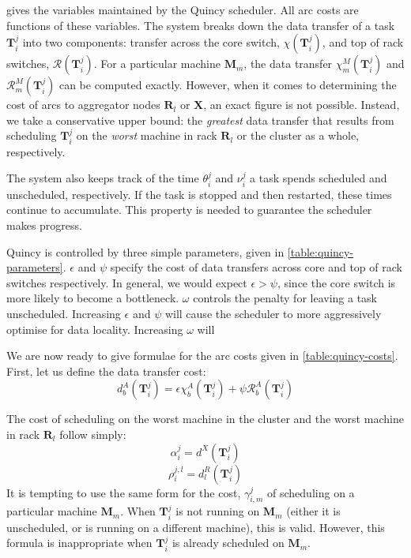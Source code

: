  gives the variables maintained by the Quincy scheduler. All arc costs are functions of these variables. The system breaks down the data transfer of a task $\mathbf{T}_{i}^{j}$ into two components: transfer across the core switch, $\chi\left(\mathbf{T}_{i}^{j}\right)$, and top of rack switches, $\mathcal{R}\left(\mathbf{T}_{i}^{j}\right)$. For a particular machine $\mathbf{M}_m$, the data transfer $\chi_{m}^{M}\left(\mathbf{T}_{i}^{j}\right)$ and $\mathcal{R}_{m}^{M}\left(\mathbf{T}_{i}^{j}\right)$ can be computed exactly. However, when it comes to determining the cost of arcs to aggregator nodes $\mathbf{R}_l$ or $\mathbf{X}$, an exact figure is not possible. Instead, we take a conservative upper bound: the \emph{greatest} data transfer that results from scheduling $\mathbf{T}_{i}^{j}$ on the \emph{worst} machine in rack $\mathbf{R}_l$ or the cluster as a whole, respectively.

The system also keeps track of the time $\theta_i^j$ and $\nu_i^j$ a task spends scheduled and unscheduled, respectively. If the task is stopped and then restarted, these times continue to accumulate. This property is needed to guarantee the scheduler makes progress.

Quincy is controlled by three simple parameters, given in \cref{table:quincy-parameters}. $\epsilon$ and $\psi$ specify the cost of data transfers across core and top of rack switches respectively. In general, we would expect $\epsilon > \psi$, since the core switch is more likely to become a bottleneck. $\omega$ controls the penalty for leaving a task unscheduled\footnotemark. Increasing $\epsilon$ and $\psi$ will cause the scheduler to more aggressively optimise for data locality. Increasing $\omega$ will 

We are now ready to give formulae for the arc costs given in \cref{table:quincy-costs}. First, let us define the data transfer cost:
\[d_{b}^{A}\left(\mathbf{T}_{i}^{j}\right) = \epsilon\chi_{b}^{A}\left(\mathbf{T}_{i}^{j}\right)+\psi\mathcal{R}_{b}^{A}\left(\mathbf{T}_{i}^{j}\right)\]

The cost of scheduling on the worst machine in the cluster and the worst machine in rack $\mathbf{R}_l$ follow simply:
\[\alpha_{i}^{j} = d^X\left(\mathbf{T}_{i}^{j}\right)\]
\[\rho_{i}^{j,l} = d^R_l\left(\mathbf{T}_{i}^{j}\right)\]
It is tempting to use the same form for the cost, $\gamma^j_{i,m}$ of scheduling on a particular machine $\mathbf{M}_m$. When $\mathbf{T}_{i}^{j}$ is not running on $\mathbf{M}_m$ (either it is unscheduled, or is running on a different machine), this is valid. However, this formula is inappropriate when $\mathbf{T}_{i}^{j}$ is already scheduled on  $\mathbf{M}_m$.

